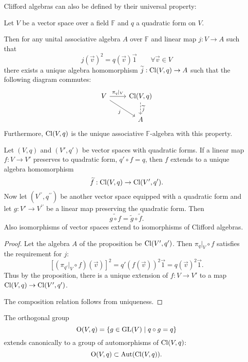 Clifford algebras can also be defined by their universal property:
\begin{proposition} \label{CliffordUniversalProperty}
Let $V$ be a vector space over a field $\mathbb{F}$ and $q$ a quadratic form on $V$. 

Then for any unital associative algebra $A$ over $\mathbb{F}$ and linear map $j: V \to A$ such that
\[ j(\vec{v})^2 = q(\vec{v}) \vec{1} \qquad \forall \vec{v}\in V \]
there exists a unique algebra homomorphism $\widetilde{j}: \operatorname{Cl}(V,q)\to A$ such that the following diagram commutes:
\[ \begin{tikzcd}
V \rar{\pi_q|_V} \ar[dr, swap, "{j}"] & \Cl(V,q) \dar[dashed]{\widetilde{j}} \\
 & A
\end{tikzcd} \]
Furthermore, $\operatorname{Cl}(V,q)$ is the unique associative $\mathbb{F}$-algebra with this property.
\end{proposition}
\begin{corollary}
Let $(V,q)$ and $(V',q')$ be vector spaces with quadratic forms. If a linear map $f:V\to V'$ preserves to quadratic form, $q'\circ f = q$, then $f$ extends to a unique algebra homomorphism
\[ \widetilde{f}: \operatorname{Cl}(V,q) \to \operatorname{Cl}(V',q'). \]
Now let $(V^{\prime\prime},q^{\prime\prime})$ be another vector space equipped with a quadratic form and let $g: V'\to V^{\prime\prime}$ be a linear map preserving the quadratic form. Then
\[ \widetilde{g\circ f} = \widetilde{g}\circ\widetilde{f}. \]
Also isomorphisms of vector spaces extend to isomorphisms of Clifford algebras.
\end{corollary}
\begin{proof}
Let the algebra $A$ of the proposition be $\operatorname{Cl}(V',q')$. Then $\pi_q|_V\circ f$ satisfies the requirement for $j$:
\[ [(\pi_{q'}|_V\circ f)(\vec{v})]^2 = q'(f(\vec{v}))^2 \vec{1} = q(\vec{v})^2\vec{1}. \]
Thus by the proposition, there is a unique extension of $f:V\to V'$ to a map $\operatorname{Cl}(V,q) \to \operatorname{Cl}(V',q')$.

The composition relation follows from uniqueness.
\end{proof}
\begin{corollary} \label{qOrthogonalMaps}
The orthogonal group
\[ \Ogroup(V,q) = \setbuilder{g\in\GL(V)}{q\circ g = q} \]
extends canonically to a group of automorphisms of $\operatorname{Cl}(V,q)$:
\[ \operatorname{O}(V,q) \subset \operatorname{Aut}(\operatorname{Cl}(V,q)). \]
\end{corollary}

